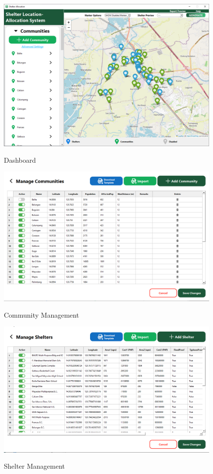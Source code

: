 \documentclass[12pt,a4paper,]{article}
\begin{document}
	\begin{figure}[h!]
		\caption{Dashboard}
		\centering
		\includegraphics[width=\columnwidth]{Chapter 4/dashboard}
		\label{db}
	\end{figure}
	
	\begin{figure}[h!]
		\caption{Community Management}
		\centering
		\includegraphics[width=\columnwidth]{Chapter 4/commadvanced}
		\label{commMan}
	\end{figure}
	
	\begin{figure}[h!]
		\caption{Shelter Management}
		\centering
		\includegraphics[width=\columnwidth]{Chapter 4/sheladvanced}
		\label{shelMan}
	\end{figure}
	
\end{document}

